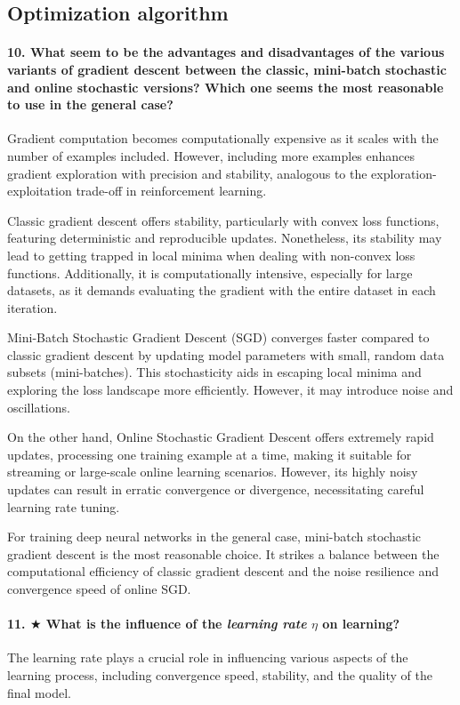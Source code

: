 \documentclass{article}
\theoremstyle{plain}%
\theoremstyle{definition}
\theoremstyle{remark}
\begin{document}
\newpage
\subsection{Optimization algorithm}
\paragraph{10. What seem to be the advantages and disadvantages of the various variants of gradient descent between the classic, mini-batch stochastic and online stochastic versions? Which one seems the most reasonable to use in the general case?}
Gradient computation becomes computationally expensive as it scales with the number of examples included. However, including more examples enhances gradient exploration with precision and stability, analogous to the exploration-exploitation trade-off in reinforcement learning.

Classic gradient descent offers stability, particularly with convex loss functions, featuring deterministic and reproducible updates. Nonetheless, its stability may lead to getting trapped in local minima when dealing with non-convex loss functions. Additionally, it is computationally intensive, especially for large datasets, as it demands evaluating the gradient with the entire dataset in each iteration.

Mini-Batch Stochastic Gradient Descent (SGD) converges faster compared to classic gradient descent by updating model parameters with small, random data subsets (mini-batches). This stochasticity aids in escaping local minima and exploring the loss landscape more efficiently. However, it may introduce noise and oscillations.

On the other hand, Online Stochastic Gradient Descent offers extremely rapid updates, processing one training example at a time, making it suitable for streaming or large-scale online learning scenarios. However, its highly noisy updates can result in erratic convergence or divergence, necessitating careful learning rate tuning.

For training deep neural networks in the general case, mini-batch stochastic gradient descent is the most reasonable choice. It strikes a balance between the computational efficiency of classic gradient descent and the noise resilience and convergence speed of online SGD.

\paragraph{11. $\bigstar$ What is the influence of the \textit{learning rate} $\eta$  on learning?}
The learning rate plays a crucial role in influencing various aspects of the learning process, including convergence speed, stability, and the quality of the final model.
\end{document}
